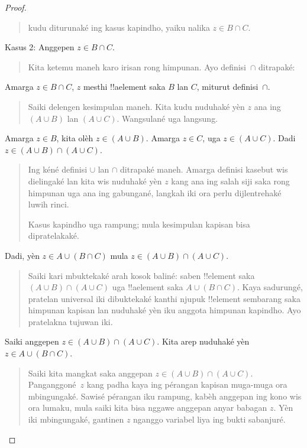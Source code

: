 \documentclass[../../../include/open-logic-section]{subfiles}
\begin{document}
\begin{proof}
\begin{quote}
kudu diturunaké ing kasus kapindho, yaiku nalika
$z \in B \cap C$.
\end{quote}
Kasus 2: Anggepen $z \in B \cap C$.
\begin{quote}
Kita ketemu maneh karo irisan rong himpunan.
Ayo definisi~$\cap$ ditrapaké:
\end{quote}
Amarga $z \in B \cap C$, $z$ mesthi !!a{element} saka
$B$ lan $C$, miturut definisi~$\cap$.
\begin{quote}
Saiki delengen kesimpulan maneh. Kita kudu nuduhaké yèn
$z$ ana ing $(A \cup B)$ lan $(A \cup C)$.
Wangsulané uga langsung.
\end{quote}
Amarga $z \in B$, kita olèh $z \in (A \cup B)$.
Amarga $z \in C$, uga $z \in (A
\cup C)$. Dadi $z \in (A \cup B) \cap (A \cup C)$.
\begin{quote}
Ing kéné definisi $\cup$ lan $\cap$ ditrapaké maneh.
Amarga definisi kasebut wis dielingaké lan kita wis
nuduhaké yèn $z$ kang ana ing salah siji saka rong
himpunan uga ana ing gabungané, langkah iki ora perlu
dijlentrehaké luwih rinci.

Kasus kapindho uga rampung; mula kesimpulan kapisan
bisa dipratelakaké.
\end{quote}
Dadi, yèn $z \in A \cup (B \cap C)$ mula
$z \in (A \cup B) \cap (A \cup C)$.
\begin{quote}
Saiki kari mbuktekaké arah kosok baliné: saben
!!{element} saka $(A \cup B) \cap (A \cup C)$
uga !!a{element} saka $A \cup (B \cap
C)$. Kaya sadurungé, pratelan universal iki dibuktekaké
kanthi njupuk !!{element} sembarang saka himpunan
kapisan lan nuduhaké yèn iku anggota himpunan kapindho.
Ayo pratelakna tujuwan iki.
\end{quote}
Saiki anggepen $z \in (A \cup B) \cap (A \cup C)$.
Kita arep nuduhaké yèn $z \in A \cup (B \cap C)$.
\begin{quote}
Saiki kita mangkat saka anggepan $z \in (A \cup B) \cap (A
\cup C)$. Panganggoné~$z$ kang padha kaya ing pérangan
kapisan muga-muga ora mbingungaké. Sawisé pérangan iku
rampung, kabèh anggepan ing kono wis ora lumaku, mula
saiki kita bisa nggawe anggepan anyar babagan $z$.
Yèn iki mbingungaké, gantinen $z$ nganggo variabel liya
ing bukti sabanjuré.


\end{quote}
\end{proof}
\end{document}
